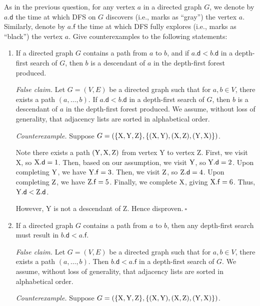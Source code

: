 \newpage
\noindent
As in the previous question, for any vertex $a$ in a directed graph $G$, we denote by $a.\mathsf{d} $ the time at which DFS on $G$ discovers (i.e., marks as ``gray'') the vertex $a$. Similarly, denote by $a.\mathsf{f} $ the time at which DFS fully explores (i.e., marks as ``black'') the vertex $a$. Give counterexamples to the following statements:
\begin{enumerate}[start=2]
    \item If a directed graph $G$ contains a path
    from $a$ to $b$, and if $a.\mathsf{d} < b.\mathsf{d}$ in a depth-first search of $G$, then $b$ is a descendant
    of $a$ in the depth-first forest produced.

\begin{solution}
\textit{False claim. }Let $G=(V,E)$ be a directed graph such that for $a,b\in V$, there exists a path $(a,\dots,b)$. If $a.\mathsf{d}<b.\mathsf{d}$ in a depth-first search of $G$, then $b$ is a descendant of $a$ in the depth-first forest produced. We assume, without loss of generality, that adjacency lists are sorted in alphabetical order.

\textit{Counterexample. }Suppose $G=(\{{\rm X},{\rm Y},{\rm Z}\},\{({\rm X},{\rm Y}),({\rm X},{\rm Z}),({\rm Y},{\rm X})\})$.

Note there exists a path $({\rm Y},{\rm X},{\rm Z})$ from vertex Y to vertex Z. First, we visit X, so ${\rm X}.\mathsf{d}=1$. Then, based on our assumption, we visit ${\rm Y}$, so ${\rm Y}.\mathsf{d}=2$. Upon completing ${\rm Y}$, we have ${\rm Y}.\mathsf{f}=3$. Then, we visit ${\rm Z}$, so ${\rm Z}.\mathsf{d}=4$. Upon completing ${\rm Z}$, we have ${\rm Z}.\mathsf{f}=5$. Finally, we complete ${\rm X}$, giving ${\rm X}.\mathsf{f}=6$. Thus, ${\rm Y}.\mathsf{d}<{\rm Z}.\mathsf{d}$.

However, Y is not a descendant of Z. Hence disproven.$~\square$
\end{solution}
\item If a directed graph $G$ contains a path from $a$ to $b$, then any depth-first search must result in $b.\mathsf{d} < a.\mathsf{f}$.
\begin{solution}
\textit{False claim. }Let $G=(V,E)$ be a directed graph such that for $a,b\in V$, there exists a path $(a,\dots,b)$. Then $b.\mathsf{d}<a.\mathsf{f}$ in a depth-first search of $G$. We assume, without loss of generality, that adjacency lists are sorted in alphabetical order.

\textit{Counterexample. }Suppose $G=(\{{\rm X},{\rm Y},{\rm Z}\},\{({\rm X},{\rm Y}),({\rm X},{\rm Z}),({\rm Y},{\rm X})\})$.


\end{solution}
\end{enumerate}

